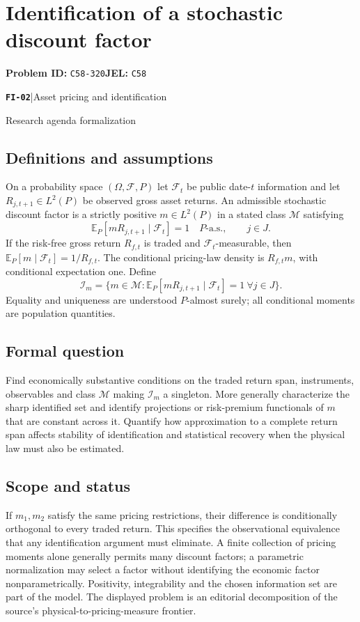 \documentclass[11pt,a4paper]{article}
\newcommand{\E}{\mathbb E}
\newcommand{\entrymeta}[3]{{\sffamily\small\color{muted}\textbf{\texttt{#1}}\quad|\quad #2\par #3\par}}
\begin{document}
\section*{Identification of a stochastic discount factor}
\textbf{Problem ID:} \texttt{C58-320}\quad \textbf{JEL:} \texttt{C58}\par
\label{problem:OP-0579}
\label{beyond:FI-02}
\entrymeta{FI-02}{Asset pricing and identification}{Research agenda formalization}
\subsection*{Definitions and assumptions}
On a probability space $(\Omega,\mathcal F,P)$ let $\mathcal F_t$ be public date-$t$ information and let $R_{j,t+1}\in L^2(P)$ be observed gross asset returns. An admissible stochastic discount factor is a strictly positive $m\in L^2(P)$ in a stated class $\mathcal M$ satisfying
\[
 \E_P[mR_{j,t+1}\mid\mathcal F_t]=1\quad P\text{-a.s.},\qquad j\in J.
\]
If the risk-free gross return $R_{f,t}$ is traded and $\mathcal F_t$-measurable, then $\E_P[m\mid\mathcal F_t]=1/R_{f,t}$. The conditional pricing-law density is $R_{f,t}m$, with conditional expectation one. Define
\[
 \mathcal I_m=\{m\in\mathcal M:\E_P[mR_{j,t+1}\mid\mathcal F_t]=1\ \forall j\in J\}.
\]
Equality and uniqueness are understood $P$-almost surely; all conditional moments are population quantities.
\subsection*{Formal question}
Find economically substantive conditions on the traded return span, instruments, observables and class $\mathcal M$ making $\mathcal I_m$ a singleton. More generally characterize the sharp identified set and identify projections or risk-premium functionals of $m$ that are constant across it. Quantify how approximation to a complete return span affects stability of identification and statistical recovery when the physical law must also be estimated.
\subsection*{Scope and status}
If $m_1,m_2$ satisfy the same pricing restrictions, their difference is conditionally orthogonal to every traded return. This specifies the observational equivalence that any identification argument must eliminate. A finite collection of pricing moments alone generally permits many discount factors; a parametric normalization may select a factor without identifying the economic factor nonparametrically. Positivity, integrability and the chosen information set are part of the model. The displayed problem is an editorial decomposition of the source's physical-to-pricing-measure frontier.
\end{document}
